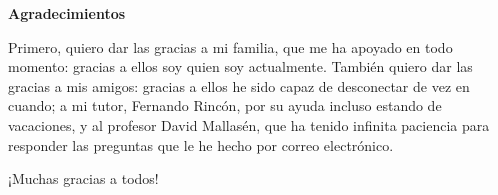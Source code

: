 \thispagestyle{empty}

\parindent=16mm

\vspace*{2cm}

\begin{flushleft}
  \begin{Large}
    \textbf{Agradecimientos}\\
  \end{Large}
  \masterRule
\end{flushleft}

Primero, quiero dar las gracias a mi familia, que me ha apoyado en todo momento: gracias a ellos soy quien soy actualmente. También quiero dar las gracias a mis amigos: gracias a ellos he sido capaz de desconectar de vez en cuando; a mi tutor, Fernando Rincón, por su ayuda incluso estando de vacaciones, y al profesor David Mallasén, que ha tenido infinita paciencia para responder las preguntas que le he hecho por correo electrónico.

¡Muchas gracias a todos!

\emptyPage

